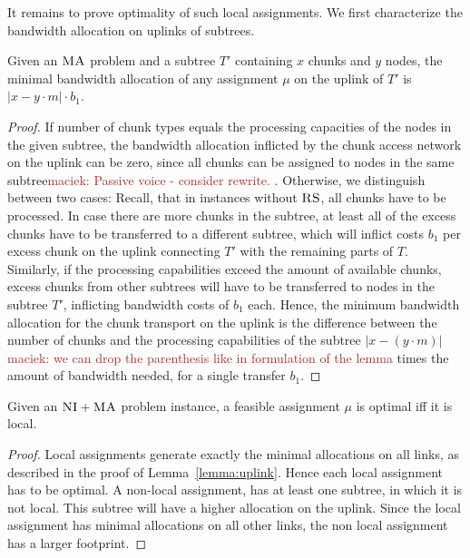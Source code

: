 \documentclass[9pt]{sigcomm-alternate}
\newcommand{\maciek}[1]{\textcolor{brown}{maciek: #1}}
\newcommand{\MaFactor}{m}
\newcommand{\VmChunkAssignment}{\mu}
\newcommand{\CC}{\textsc{NI}}
\newcommand{\RS}{\textsc{RS}}
\newcommand{\MA}{\textsc{MA}}
\newcommand{\Tree}{\ensuremath{T}}
\newcommand{\CostTrans}{\ensuremath{b_1}}
\begin{document}
It remains to prove optimality of such local assignments.
We first characterize the bandwidth allocation on uplinks of subtrees.
\begin{lemma}\label{lem:uplink-alloc}
Given an $\MA$ problem and a subtree $\Tree'$
containing $x$
chunks and $y$ nodes, the minimal bandwidth allocation of any
assignment
$\VmChunkAssignment$ on the uplink of $\Tree'$ is $|x-y\cdot\MaFactor|\cdot
\CostTrans$. \label{lemma:uplink}
\end{lemma}
\begin{proof}
  If number of chunk types equals the processing capacities of the nodes in the given subtree,
the bandwidth allocation inflicted by the chunk access network on the uplink can be
zero, since all chunks can be assigned to nodes in the same subtree\maciek{Passive voice - consider rewrite.}
.
Otherwise, we distinguish between two cases: Recall, that in instances
without $\RS$, all chunks have to be processed. In case
there are more chunks in the subtree, at least all of the excess chunks have to
be transferred to a different subtree, which will
inflict costs $\CostTrans$ per excess chunk on the uplink connecting $\Tree'$
with the
remaining parts of $\Tree$. Similarly, if the processing capabilities exceed the
amount of
available chunks, excess chunks from other subtrees will have to be transferred
to
nodes in the subtree $\Tree'$, inflicting bandwidth costs of $\CostTrans$ each.
Hence, the minimum bandwidth allocation for the chunk transport on the uplink
is the difference between the number of chunks and the processing capabilities
of the subtree $|x-(y\cdot\MaFactor)|$ \maciek{we can drop the parenthesis like in formulation of the lemma} times the amount of bandwidth needed,
for a single transfer $\CostTrans$.
\end{proof}


\begin{theorem}
Given an $\CC+\MA$ problem instance, a feasible assignment $\VmChunkAssignment$
is optimal iff it is local.
\label{thm:local_optimal}
\end{theorem}

\begin{proof}
Local assignments generate exactly the minimal allocations on all links, as described in
the proof of
Lemma~\ref{lemma:uplink}. Hence
each local assignment has to be optimal. A non-local assignment, has at least
one subtree, in which it is not local. This subtree will have a higher
allocation on the uplink. Since the local assignment has minimal allocations
on all other links, the non local assignment has a larger footprint.
\end{proof}
\end{document}
